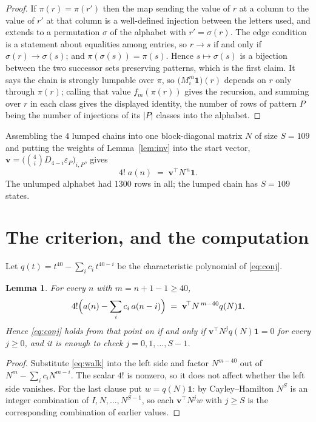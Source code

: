 \documentclass[11pt,a4paper]{article}
\theoremstyle{plain}
\newtheorem{lemma}[theorem]{Lemma}
\theoremstyle{definition}
\begin{document}
\begin{proof}
If $\pi(r)=\pi(r')$ then the map sending the value of $r$ at a column to the value of $r'$
at that column is a well-defined injection between the letters used, and extends to a
permutation $\sigma$ of the alphabet with $r'=\sigma(r)$. The edge condition is a statement
about equalities among entries, so $r\to s$ if and only if $\sigma(r)\to\sigma(s)$; and
$\pi(\sigma(s))=\pi(s)$. Hence $s\mapsto\sigma(s)$ is a bijection between the two successor
sets preserving patterns, which is the first claim. It says the chain is strongly lumpable
over $\pi$, so $\bigl(M_i^{m}\mathbf{1}\bigr)(r)$ depends on $r$ only through $\pi(r)$;
calling that value $f_m(\pi(r))$ gives the recursion, and summing over $r$ in each class
gives the displayed identity, the number of rows of pattern $P$ being the number of
injections of its $|P|$ classes into the alphabet.
\end{proof}

Assembling the $4$ lumped chains into one block-diagonal matrix $N$ of size $S=109$ and
putting the weights of Lemma~\ref{lem:inv} into the start vector,
$\mathbf{v}=\bigl(\binom{4}{i}D_{4-i}\varepsilon_P\bigr)_{i,P}$, gives
\begin{equation}\label{eq:walk}
4!\;a(n)\;=\;\mathbf{v}^{\!\top}N^{\,n}\mathbf{1} .
\end{equation}
The unlumped alphabet had $1300$ rows in all; the lumped chain has $S=109$ states.

\section{The criterion, and the computation}

Let $q(t)=t^{40}-\sum_i c_i\,t^{40-i}$ be the characteristic polynomial of
\eqref{eq:conj}.

\begin{lemma}\label{lem:crit}
For every $n$ with $m=n+1-1\ge40$,
\[
4!\Bigl(a(n)-\sum_i c_i\,a(n-i)\Bigr)\;=\;\mathbf{v}^{\!\top}N^{\,m-40}q(N)\mathbf{1} .
\]
Hence \eqref{eq:conj} holds from that point on if and only if
$\mathbf{v}^{\!\top}N^{j}q(N)\mathbf{1}=0$ for every $j\ge0$, and it is enough to check
$j=0,1,\dots,S-1$.
\end{lemma}

\begin{proof}
Substitute \eqref{eq:walk} into the left side and factor $N^{m-40}$ out of
$N^{m}-\sum_i c_iN^{m-i}$. The scalar $4!$ is nonzero, so it does not affect whether
the left side vanishes. For the last clause put $w=q(N)\mathbf{1}$: by Cayley--Hamilton
$N^{S}$ is an integer combination of $I,N,\dots,N^{S-1}$, so each
$\mathbf{v}^{\!\top}N^{j}w$ with $j\ge S$ is the corresponding combination of earlier
values.
\end{proof}
\end{document}
